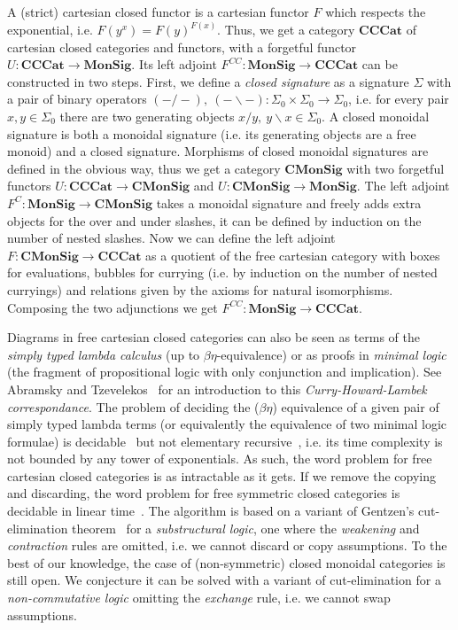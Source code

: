 A (strict) cartesian closed functor is a cartesian functor $F$ which respects the exponential, i.e. $F(y^x) = F(y)^{F(x)}$.
Thus, we get a category $\mathbf{CCCat}$ of cartesian closed categories and functors, with a forgetful functor $U : \mathbf{CCCat} \to \mathbf{MonSig}$.
Its left adjoint $F^{CC} : \mathbf{MonSig} \to \mathbf{CCCat}$ can be constructed in two steps.
First, we define a \emph{closed signature} as a signature $\Sigma$ with a pair of binary operators $(- / -), \ (- \backslash -) : \Sigma_0 \times \Sigma_0 \to \Sigma_0$, i.e. for every pair $x, y \in \Sigma_0$ there are two generating objects $x / y, \ y \backslash x \in \Sigma_0$.
A closed monoidal signature is both a monoidal signature (i.e. its generating objects are a free monoid) and a closed signature.
Morphisms of closed monoidal signatures are defined in the obvious way, thus we get a category $\mathbf{CMonSig}$ with two forgetful functors $U : \mathbf{CCCat} \to \mathbf{CMonSig}$ and $U : \mathbf{CMonSig} \to \mathbf{MonSig}$.
The left adjoint $F^C : \mathbf{MonSig} \to \mathbf{CMonSig}$ takes a monoidal signature and freely adds extra objects for the over and under slashes, it can be defined by induction on the number of nested slashes.
Now we can define the left adjoint $F : \mathbf{CMonSig} \to \mathbf{CCCat}$ as a quotient of the free cartesian category with boxes for evaluations, bubbles for currying (i.e. by induction on the number of nested curryings) and relations given by the axioms for natural isomorphisms.
Composing the two adjunctions we get $F^{CC} : \mathbf{MonSig} \to \mathbf{CCCat}$.

Diagrams in free cartesian closed categories can also be seen as terms of the \emph{simply typed lambda calculus} (up to $\beta\eta$-equivalence) or as proofs in \emph{minimal logic} (the fragment of propositional logic with only conjunction and implication).
See Abramsky and Tzevelekos~\cite{AbramskyTzevelekos10} for an introduction to this \emph{Curry-Howard-Lambek correspondance}.
The problem of deciding the ($\beta\eta$) equivalence of a given pair of simply typed lambda terms (or equivalently the equivalence of two minimal logic formulae) is decidable~\cite{Tait67} but not elementary recursive~\cite{Statman79}, i.e. its time complexity is not bounded by any tower of exponentials.
As such, the word problem for free cartesian closed categories is as intractable as it gets.
If we remove the copying and discarding, the word problem for free symmetric closed categories is decidable in linear time~\cite{Voreadou77}.
The algorithm is based on a variant of Gentzen's cut-elimination theorem~\cite{Gentzen35} for a \emph{substructural logic}, one where the \emph{weakening} and \emph{contraction} rules are omitted, i.e. we cannot discard or copy assumptions.
To the best of our knowledge, the case of (non-symmetric) closed monoidal categories is still open.
We conjecture it can be solved with a variant of cut-elimination for a \emph{non-commutative logic} omitting the \emph{exchange} rule, i.e. we cannot swap assumptions.

